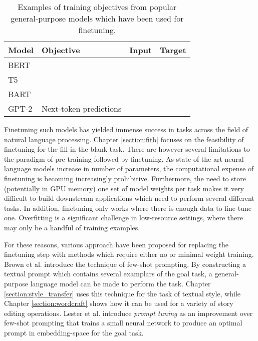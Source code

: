 \begin{table}
    \centering
    \begin{tabular}{l|l|p{2in}|p{2in}}
        \toprule 
        Model & Objective & Input & Target \\
        \hline
        BERT & \TODO{} & \TODO{} & \TODO{} \\
        T5 & \TODO{} & \TODO{} & \TODO{} \\
        BART & \TODO{} & \TODO{} & \TODO{} \\
        GPT-2 & Next-token predictions & \TODO{} & \TODO{} \\
        \bottomrule
    \end{tabular}
    \caption{Examples of training objectives from popular general-purpose models which have been used for finetuning.}
    \label{tab:common_pretrained_models}
\end{table}

Finetuning such models has yielded immense success in tasks across the field of natural language processing.
Chapter \ref{section:fitb} focuses on the feasibility of finetuning for the fill-in-the-blank task.
There are however several limitations to the paradigm of pre-training followed by finetuning.
As state-of-the-art neural language models increase in number of parameters, the computational expense of finetuning is becoming increasingly prohibitive.
Furthermore, the need to store (potentially in GPU memory) one set of model weights per task makes it very difficult to build downstream applications which need to perform several different tasks.
In addition, finetuning only works where there is enough data to fine-tune one.
Overfitting is a significant challenge in low-resource settings, where there may only be a handful of training examples.

For these reasons, various approach have been proposed for replacing the finetuning step with methods which require either no or minimal weight training.
Brown et al. \citep{brown2020language} introduce the technique of few-shot prompting.
By constructing a textual prompt which contains several examplars of the goal task, a general-purpose language model can be made to perform the task.
Chapter \ref{section:style_transfer} uses this technique for the task of textual style, while Chapter \ref{section:wordcraft} shows how it can be used for a variety of story editing operations.
Lester et al. \citep{lester2021power} introduce \textit{prompt tuning} as an improvement over few-shot prompting that trains a small neural network to produce an optimal prompt in embedding-space for the goal task.

